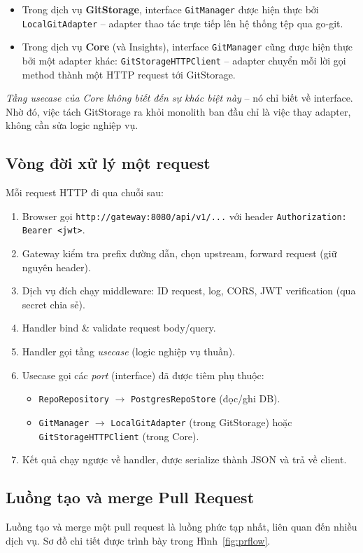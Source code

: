 \begin{itemize}
\item Trong dịch vụ \textbf{GitStorage}, interface \texttt{GitManager} được hiện thực bởi \texttt{LocalGitAdapter} -- adapter thao tác trực tiếp lên hệ thống tệp qua go-git.
\item Trong dịch vụ \textbf{Core} (và Insights), interface \texttt{GitManager} cũng được hiện thực bởi một adapter khác: \texttt{GitStorageHTTPClient} -- adapter chuyển mỗi lời gọi method thành một HTTP request tới GitStorage.
\end{itemize}

\textit{Tầng usecase của Core không biết đến sự khác biệt này} -- nó chỉ biết về interface. Nhờ đó, việc tách GitStorage ra khỏi monolith ban đầu chỉ là việc thay adapter, không cần sửa logic nghiệp vụ.

\subsection{Vòng đời xử lý một request}
Mỗi request HTTP đi qua chuỗi sau:
\begin{enumerate}
\item Browser gọi \texttt{http://gateway:8080/api/v1/...} với header \texttt{Authorization: Bearer <jwt>}.
\item Gateway kiểm tra prefix đường dẫn, chọn upstream, forward request (giữ nguyên header).
\item Dịch vụ đích chạy middleware: ID request, log, CORS, JWT verification (qua secret chia sẻ).
\item Handler bind \& validate request body/query.
\item Handler gọi tầng \textit{usecase} (logic nghiệp vụ thuần).
\item Usecase gọi các \textit{port} (interface) đã được tiêm phụ thuộc:
  \begin{itemize}
  \item \texttt{RepoRepository} $\to$ \texttt{PostgresRepoStore} (đọc/ghi DB).
  \item \texttt{GitManager} $\to$ \texttt{LocalGitAdapter} (trong GitStorage) hoặc \texttt{GitStorageHTTPClient} (trong Core).
  \end{itemize}
\item Kết quả chạy ngược về handler, được serialize thành JSON và trả về client.
\end{enumerate}

\subsection{Luồng tạo và merge Pull Request}
Luồng tạo và merge một pull request là luồng phức tạp nhất, liên quan đến nhiều dịch vụ. Sơ đồ chi tiết được trình bày trong Hình~\ref{fig:prflow}.

